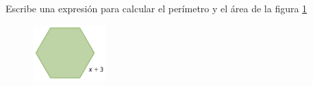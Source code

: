 Escribe una expresión para calcular el perímetro y el área de la figura \ref{fig:20230319032932}

\begin{figure}[H]
    \centering
    \includegraphics[width=0.25\textwidth]{../images/20230319032932}
    \caption{}
    \label{fig:20230319032932}
\end{figure}
